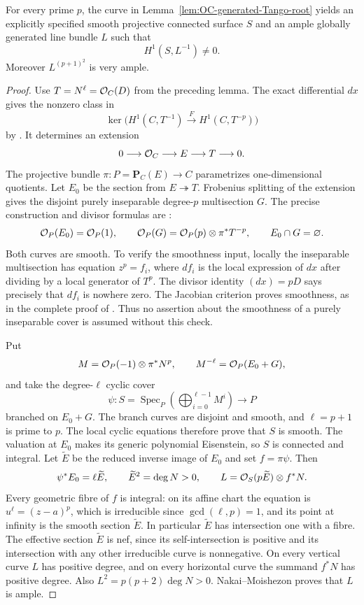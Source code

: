 \begin{proposition}
\label{prop:OC-generated-Raynaud}
For every prime $p$, the curve in Lemma~\ref{lem:OC-generated-Tango-root} yields an explicitly specified smooth projective connected surface $S$ and an ample globally generated line bundle $L$ such that
\[
                         H^1(S,L^{-1})\ne0.
\]
Moreover $L^{(p+1)^2}$ is very ample.
\end{proposition}
\begin{proof}
Use $T=N^\ell=\mathcal O_C(D)$ from the preceding lemma.  The exact differential $dx$ gives the nonzero class in
\[
 \ker\bigl(H^1(C,T^{-1})\xrightarrow{F}H^1(C,T^{-p})\bigr)
\]
by \cite[Theorem~1.2 and its proof in~1.2]{Mukai2011Kodaira}.  It determines an extension
\[
              0\longrightarrow\mathcal O_C\longrightarrow E
                  \longrightarrow T\longrightarrow0.
\]
The projective bundle $\pi:P=\mathbf P_C(E)\to C$ parametrizes one-dimensional quotients.  Let $E_0$ be the section from $E\twoheadrightarrow T$.  Frobenius splitting of the extension gives the disjoint purely inseparable degree-$p$ multisection $G$.  The precise construction and divisor formulas are
\cite[Section~2.2, Proposition~2.2]{Zheng2017Kodaira}:
\[
 \mathcal O_P(E_0)=\mathcal O_P(1),\qquad
 \mathcal O_P(G)=\mathcal O_P(p)\otimes\pi^*T^{-p},\qquad E_0\cap G=\varnothing.
\]
Both curves are smooth.  To verify the smoothness input, locally the inseparable multisection has equation $z^p=f_i$, where $df_i$ is the local expression of $dx$ after dividing by a local generator of $T^p$.  The divisor identity $(dx)=pD$ says precisely that $df_i$ is nowhere zero.  The Jacobian criterion proves smoothness, as in the complete proof of \cite[Proposition~1.7]{Mukai2011Kodaira}.  Thus no assertion about the smoothness of a purely inseparable cover is assumed without this check.

Put
\[
 M=\mathcal O_P(-1)\otimes\pi^*N^p,
 \qquad M^{-\ell}=\mathcal O_P(E_0+G),
\]
and take the degree-$\ell$ cyclic cover
\[
 \psi:S=\operatorname{Spec}_P\!\left(\bigoplus_{i=0}^{\ell-1}M^i\right)
       \longrightarrow P
\]
branched on $E_0+G$.  The branch curves are disjoint and smooth, and $\ell=p+1$ is prime to $p$.  The local cyclic equations therefore prove that $S$ is smooth.  The valuation at $E_0$ makes its generic polynomial Eisenstein, so $S$ is connected and integral.  Let $\widetilde E$ be the reduced inverse image of $E_0$ and set $f=\pi\psi$.  Then
\[
 \psi^*E_0=\ell\widetilde E,
 \qquad \widetilde E^2=\deg N>0,
 \qquad L=\mathcal O_S(p\widetilde E)\otimes f^*N.
\]
Every geometric fibre of $f$ is integral: on its affine chart the equation is $u^\ell=(z-a)^p$, which is irreducible since $\gcd(\ell,p)=1$, and its point at infinity is the smooth section $\widetilde E$.  In particular $\widetilde E$ has intersection one with a fibre.  The effective section $\widetilde E$ is nef, since its self-intersection is positive and its intersection with any other irreducible curve is nonnegative.  On every vertical curve $L$ has positive degree, and on every horizontal curve the summand $f^*N$ has positive degree.  Also $L^2=p(p+2)\deg N>0$.  Nakai--Moishezon proves that $L$ is ample.


\end{proof}
